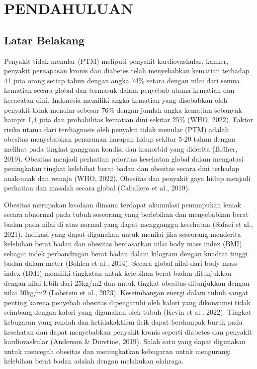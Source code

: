 \chapter{PENDAHULUAN}
\label{chap:pendahuluan}


\section{Latar Belakang}
\label{sec:latarbelakang}

Penyakit tidak menular (PTM) meliputi penyakit kardiovaskular, kanker, penyakit pernapasan kronis dan diabetes telah menyebabkan kematian terhadap 41 juta orang setiap tahun dengan angka 74\% setara dengan nilai dari semua kematian secara global dan termasuk dalam penyebab utama kematian dan kecacatan dini. Indonesia memiliki angka kematian yang disebabkan oleh penyakit tidak menular sebesar 76\% dengan jumlah angka kematian sebanyak hampir 1,4 juta dan probabilitas kematian dini sekitar 25\% (WHO, 2022). Faktor risiko utama dari terdiagnosis oleh penyakit tidak menular (PTM) adalah obesitas menyebabkan penurunan harapan hidup sekitar 5-20 tahun dengan melihat pada tingkat gangguan kondisi dan komorbid yang diderita (Blüher, 2019). Obesitas menjadi perhatian prioritas kesehatan global dalam mengatasi peningkatan tingkat kelebihat berat badan dan obesitas secara dini terhadap anak-anak dan remaja (WHO, 2022). Obesitas dan penyakit gaya hidup menjadi perhatian dan masalah secara global (Caballero et al., 2019).

Obesitas merupakan keadaan dimana terdapat akumulasi penumpukan lemak secara abnormal pada tubuh seseorang yang berlebihan dan menyebabkan berat badan pada nilai di atas normal yang dapat mengganggu kesehatan (Safaei et al., 2021). Indikasi yang dapat digunakan untuk menilai jika seseorang menderita kelebihan berat badan dan obesitas berdasarkan nilai body mass index (BMI) sebagai indek perbandingan berat badan dalam kilogram dengan kuadrat tinggi badan dalam meter (Bohlen et al., 2014). Secara global nilai dari body mass index (BMI) memiliki tingkatan untuk kelebihan berat badan ditunjukkan dengan nilai lebih dari 25kg/m2 dan untuk tingkat obesitas ditunjukkan dengan nilai 30kg/m2 (Lobstein et al., 2023). Keseimbangan energi dalam tubuh sangat penting karena penyebab obesitas dipengaruhi oleh kalori yang dikonsumsi tidak seimbang dengan kalori yang digunakan oleh tubuh (Kevin et al., 2022). Tingkat kebugaran yang rendah dan ketidakaktifan fisik dapat berdampak buruk pada kesehatan dan dapat menyebabkan penyakit kronis seperti diabetes dan penyakit kardiovaskular (Anderson \& Durstine, 2019). Salah satu yang dapat digunakan untuk mencegah obesitas dan meningkatkan kebugaran untuk mengurangi kelebihan berat badan adalah dengan melakukan olahraga.

